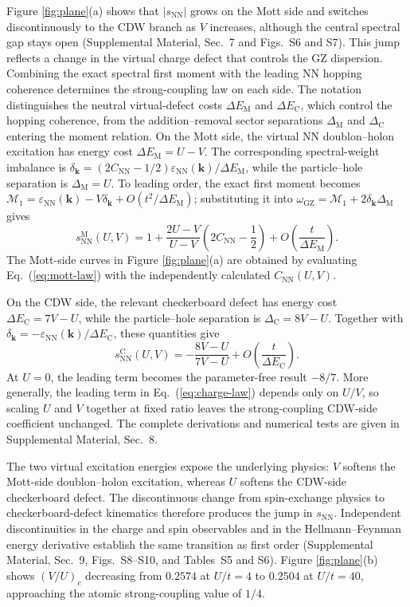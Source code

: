 \documentclass[aps,prl,reprint,superscriptaddress,nofootinbib,longbibliography]{revtex4-1}
\newcommand{\epsk}{\varepsilon_{\mathrm{NN}}(\mathbf{k})}
\newcommand{\wzero}{\omega_{\mathrm{GZ}}}
\newcommand{\disp}[1]{Eq.~(\ref{#1})}
\newcommand{\Figdisp}[1]{Figure \ref{#1}}
\begin{document}
\Figdisp{fig:plane}(a) shows that $|s_{\mathrm{NN}}|$ grows on the Mott side and switches discontinuously to the CDW branch as $V$ increases, although the central spectral gap stays open (Supplemental Material, Sec.~7 and Figs.~S6 and S7). This jump reflects a change in the virtual charge defect that controls the GZ dispersion. Combining the exact spectral first moment with the leading NN hopping coherence determines the strong-coupling law on each side. The notation distinguishes the neutral virtual-defect costs $\Delta E_{\mathrm M}$ and $\Delta E_{\mathrm C}$, which control the hopping coherence, from the addition--removal sector separations $\Delta_{\mathrm M}$ and $\Delta_{\mathrm C}$ entering the moment relation. On the Mott side, the virtual NN doublon--holon excitation has energy cost
$\Delta E_{\mathrm M}=U-V$. The corresponding spectral-weight imbalance is
$\delta_{\mathbf k}=(2C_{\mathrm{NN}}-1/2)\epsk/\Delta E_{\mathrm M}$, while the particle--hole separation is $\Delta_{\mathrm M}=U$. To leading order, the exact first moment becomes
$\mathcal M_1=\epsk-V\delta_{\mathbf k}+O(t^2/\Delta E_{\mathrm M})$; substituting it into
$\wzero=\mathcal M_1+2\delta_{\mathbf k}\Delta_{\mathrm M}$ gives
\begin{equation}
 s_{\mathrm{NN}}^{\mathrm M}(U,V)
 =1+\frac{2U-V}{U-V}
 \left(2C_{\mathrm{NN}}-\frac12\right)
 +O\!\left(\frac{t}{\Delta E_{\mathrm M}}\right).
 \label{eq:mott-law}
\end{equation}
The Mott-side curves in \Figdisp{fig:plane}(a) are obtained by evaluating \disp{eq:mott-law} with the independently calculated $C_{\mathrm{NN}}(U,V)$.


On the CDW side, the relevant checkerboard defect has energy cost
$\Delta E_{\mathrm C}=7V-U$, while the particle--hole separation is
$\Delta_{\mathrm C}=8V-U$. Together with
$\delta_{\mathbf k}=-\epsk/\Delta E_{\mathrm C}$, these quantities give
\begin{equation}
 s_{\mathrm{NN}}^{\mathrm C}(U,V)
 =-\frac{8V-U}{7V-U}
 +O\!\left(\frac{t}{\Delta E_{\mathrm C}}\right).
 \label{eq:charge-law}
\end{equation}
At $U=0$, the leading term becomes the parameter-free result $-8/7$. More generally, the leading term in \disp{eq:charge-law} depends only on $U/V$, so scaling $U$ and $V$ together at fixed ratio leaves the strong-coupling CDW-side coefficient unchanged. The complete derivations and numerical tests are given in Supplemental Material, Sec.~8.

The two virtual excitation energies expose the underlying physics: $V$ softens the
Mott-side doublon--holon excitation, whereas $U$ softens the CDW-side
checkerboard defect. The discontinuous change from spin-exchange physics to
checkerboard-defect kinematics therefore produces the jump in
$s_{\mathrm{NN}}$. Independent discontinuities in the charge and spin
observables and in the Hellmann--Feynman energy derivative establish the same
transition as first order (Supplemental Material, Sec.~9, Figs.~S8--S10, and
Tables~S5 and S6). \Figdisp{fig:plane}(b) shows $(V/U)_c$ decreasing from $0.2574$ at
$U/t=4$ to $0.2504$ at $U/t=40$, approaching the atomic strong-coupling value
of $1/4$.
\end{document}

